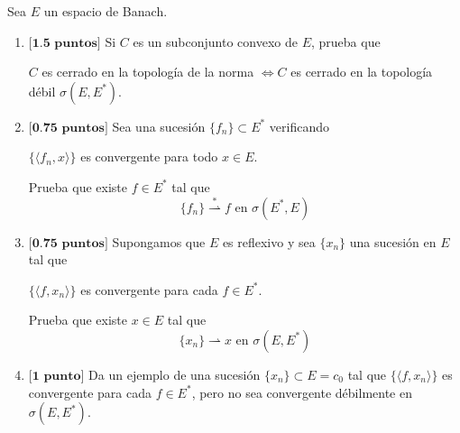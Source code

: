 \documentclass[12pt]{article}
\begin{document}
    \begin{ejercicio}
        Sea $E$ un espacio de Banach.
        \begin{enumerate}[label=\alph*)]
            \item $\textbf{[1.5 puntos]}$ Si $C$ es un subconjunto convexo de $E$, prueba que
                \begin{center}
                    $C$ es cerrado en la topología de la norma $\Longleftrightarrow C$ es cerrado en la topología débil $\sigma(E,E^\ast)$.
                \end{center}
            \item $\textbf{[0.75 puntos]}$ Sea una sucesión $\{f_n\}\subset E^\ast$ verificando
                \begin{center}
                    $\{\langle f_n,x \rangle \}$ es convergente para todo $x\in E$.
                \end{center}
                Prueba que existe $f\in E^\ast$ tal que
                \begin{equation*}
                    \{f_n\}\stackrel{\ast}{\rightharpoonup} f \text{\ en\ } \sigma(E^\ast,E)
                \end{equation*}
            \item $\textbf{[0.75 puntos]}$ Supongamos que $E$ es reflexivo y sea $\{x_n\}$ una sucesión en $E$ tal que
                \begin{center}
                    $\{\langle f,x_n \rangle \}$ es convergente para cada $f\in E^\ast$.
                \end{center}
                Prueba que existe $x\in E$ tal que
                \begin{equation*}
                    \{x_n\}\rightharpoonup x \text{\ en\ } \sigma(E,E^\ast)
                \end{equation*}
            \item $\textbf{[1 punto]}$ Da un ejemplo de una sucesión $\{x_n\}\subset E = c_0$ tal que $\{\langle f,x_n \rangle \}$ es convergente para cada $f\in E^\ast$, pero no sea convergente débilmente en $\sigma(E,E^\ast)$.
        \end{enumerate}
    \end{ejercicio}
    \newpage
    \setcounter{ejercicio}{0} %
\end{document}
